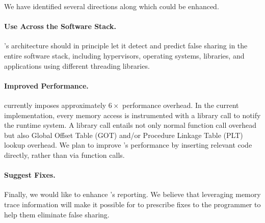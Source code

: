 \label{sec:futurework}

We have identified several directions along which \Predator{} could be enhanced.

\paragraph{Use Across the Software Stack.} 
\Predator{}'s architecture should in principle let it detect and predict false sharing in the entire software stack, including hypervisors, operating systems, libraries, and applications using different threading libraries.

\paragraph{Improved Performance.}
\Predator{} currently imposes approximately $6\times$ performance overhead. In the current implementation, every memory access is instrumented with a library call to notify the runtime system. A library call entails not only normal function call overhead but also Global Offset Table (GOT) and/or Procedure Linkage Table (PLT) lookup overhead. We plan to improve \Predator{}'s performance by inserting relevant code directly, rather than via function calls.

\paragraph{Suggest Fixes.} Finally, we would like to enhance \Predator{}'s reporting. We believe that leveraging memory trace information will make it possible for \Predator{} to prescribe fixes to the programmer to help them eliminate false sharing.
  
